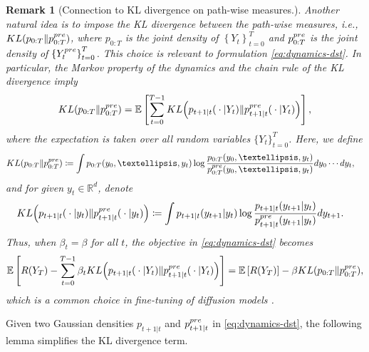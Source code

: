 \documentclass[10pt,a4paper]{amsart}
\newtheorem{Remark}[Theorem]{Remark}
\newcommand{\R}{\mathbb{R}}
\newcommand{\curly}[1]{\left\lbrace #1 \right\rbrace}
\newcommand{\bracket}[1]{\left[ #1 \right]}
\newcommand{\E}{\mathbb{E}}
\begin{document}
    
  
    \begin{Remark}[Connection to KL divergence on path-wise measures.]
    Another natural idea is to impose the KL divergence between the path-wise measures, i.e., $ {\rm KL}(p_{0:T} \| p_{0:T}^{\rm pre}) $, where $ p_{0:T} $ is the joint density of $ \curly{Y_{t}}_{t = 0}^{T} $ and $ p_{0:T}^{\rm pre} $ is the joint density of $ \curly{Y_{t}^{\rm pre}}_{t = 0}^{T} $. This choice is relevant to formulation \eqref{eq:dynamics-dst}. In particular, the Markov property of the dynamics and the chain rule of the KL divergence imply
    \begin{align*}
        {\rm KL}(p_{0:T} \| p_{0:T}^{\rm pre}) = \E\bracket{\sum_{t = 0}^{T-1}{\rm KL}\Big(p_{t+1\vert t}({}\cdot{}\vert Y_t) \|p_{t+1\vert t}^{\rm pre}({}\cdot{}\vert Y_t)\Big)},
    \end{align*}
    where the expectation is taken over all random variables $\{Y_t\}_{t = 0}^T$. Here, we define
    \begin{align}
        {\rm KL}(p_{0:T} \| p_{0:T}^{\rm pre}) & \coloneqq \int p_{0:T}(y_0, \dots, y_t)\log\frac{p_{0:T}(y_0, \dots, y_t)}{p_{0:T}^{\rm pre}(y_0, \dots, y_t)}{\rm d}y_0\cdots {\rm d}y_t, \label{eq:kl-path}
    \end{align} 
    and for given $y_t \in \R^d$, denote
    \begin{align}
        {\rm KL}\Big(p_{t+1\vert t}({}\cdot{}\vert y_t) \|p_{t+1\vert t}^{\rm pre}({}\cdot{}\vert y_t)\Big) & \coloneqq \int p_{t+1\vert t}(y_{t+1} \vert y_t) \log \frac{p_{t+1\vert t}(y_{t+1} \vert y_t)}{p^{\rm pre}_{t+1\vert t}(y_{t+1} \vert y_t)}{\rm d}y_{t+1}.  \label{eq:kl-condition}
    \end{align}
%
Thus, when $\beta_t = \beta$ for all $t$, the objective in \eqref{eq:dynamics-dst} becomes
\begin{align*}
    \mathbb{E}\left[R(Y_T) - \sum_{t = 0}^{T-1}\beta_t{\rm KL}\Big(p_{t+1\vert t}({}\cdot{}\vert Y_t) \|p_{t+1\vert t}^{\rm pre}({}\cdot{}\vert Y_t)\Big)\right] = \mathbb{E}\left[R(Y_T)\right] - \beta  {\rm KL}(p_{0:T} \| p_{0:T}^{\rm pre}),
\end{align*}
which is a common choice in fine-tuning of diffusion models \cite{fan2024reinforcement,black2023training,zhang2001some,gao2024reward}. 
%
    \end{Remark}
   
  Given two Gaussian densities $p_{t+1\vert t}$ and $p^{\rm pre}_{t+1\vert t}$ in  \eqref{eq:dynamics-dst}, the following lemma simplifies the KL divergence term.
\end{document}
